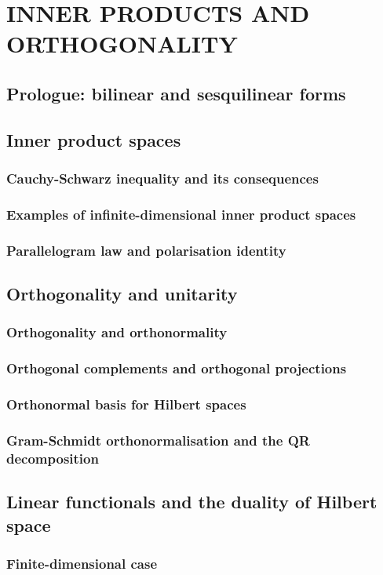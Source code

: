 \documentclass[a4paper,twoside]{article}
\theoremstyle{definition}
\theoremstyle{plain}
\begin{document}
\section{INNER PRODUCTS AND ORTHOGONALITY}
\subsection{Prologue: bilinear and sesquilinear forms}
\subsection{Inner product spaces}
\subsubsection{Cauchy-Schwarz inequality and its consequences}
\subsubsection{Examples of infinite-dimensional inner product spaces}
\subsubsection{Parallelogram law and polarisation identity}
\subsection{Orthogonality and unitarity}
\subsubsection{Orthogonality and orthonormality}
\subsubsection{Orthogonal complements and orthogonal projections}
\subsubsection{Orthonormal basis for Hilbert spaces}
\subsubsection{Gram-Schmidt orthonormalisation and the QR decomposition}
\subsection{Linear functionals and the duality of Hilbert space}
\subsubsection{Finite-dimensional case}
\end{document}
